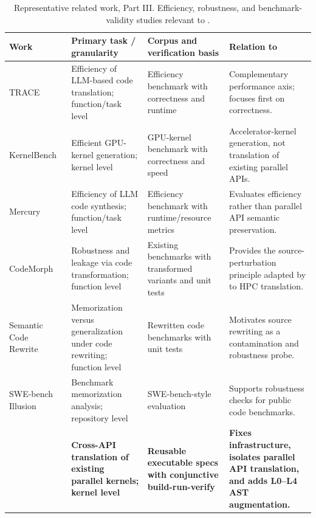 \begin{table}[p]
\centering
\caption{
Representative related work, Part III. Efficiency, robustness, and benchmark-validity studies relevant to \parbench{}.
}
\label{tab:related-work-d}
\scriptsize
\setlength{\tabcolsep}{3.2pt}
\renewcommand{\arraystretch}{1.05}
\begin{tabularx}{\textwidth}{@{}
>{\RaggedRight\arraybackslash}p{}
>{\RaggedRight\arraybackslash}p{}
>{\RaggedRight\arraybackslash}p{}
>{\RaggedRight\arraybackslash}X
@{}}
\toprule
Work & Primary task / granularity & Corpus and verification basis & Relation to \parbench{} \\
\midrule

TRACE~\cite{TRACE2026}
& Efficiency of LLM-based code translation; function/task level
& Efficiency benchmark with correctness and runtime
& Complementary performance axis; \parbench{} focuses first on correctness. \\

KernelBench~\cite{KernelBench2025}
& Efficient GPU-kernel generation; kernel level
& GPU-kernel benchmark with correctness and speed
& Accelerator-kernel generation, not translation of existing parallel APIs. \\

Mercury~\cite{Mercury2024}
& Efficiency of LLM code synthesis; function/task level
& Efficiency benchmark with runtime/resource metrics
& Evaluates efficiency rather than parallel API semantic preservation. \\

CodeMorph~\cite{CodeMorph2025}
& Robustness and leakage via code transformation; function level
& Existing benchmarks with transformed variants and unit tests
& Provides the source-perturbation principle adapted by \parbench{} to HPC translation. \\

Semantic Code Rewrite~\cite{MemorizeOrGeneralize2025}
& Memorization versus generalization under code rewriting; function level
& Rewritten code benchmarks with unit tests
& Motivates source rewriting as a contamination and robustness probe. \\

SWE-bench Illusion~\cite{SWEbenchIllusion2025}
& Benchmark memorization analysis; repository level
& SWE-bench-style evaluation
& Supports robustness checks for public code benchmarks. \\

\textbf{\parbench{}}
& \textbf{Cross-API translation of existing parallel kernels; kernel level}
& \textbf{Reusable executable specs with conjunctive build-run-verify}
& \textbf{Fixes infrastructure, isolates parallel API translation, and adds L0--L4 AST augmentation.} \\

\bottomrule
\end{tabularx}
\end{table}

